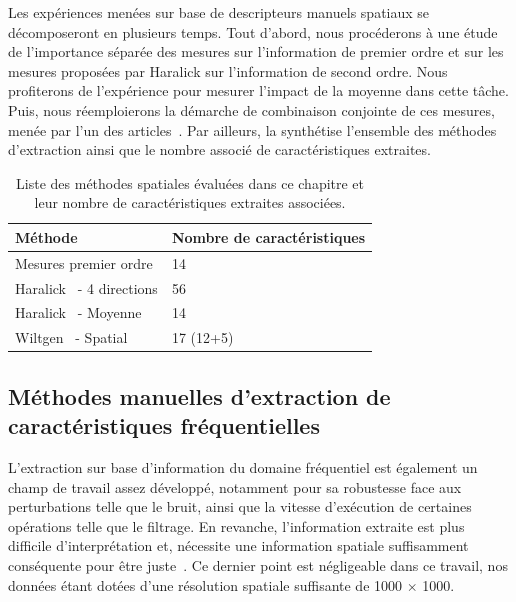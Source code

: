 Les expériences menées sur base de descripteurs manuels spatiaux se décomposeront en plusieurs temps. Tout d'abord, nous procéderons à une étude de l'importance séparée des mesures sur l'information de premier ordre et sur les mesures proposées par Haralick sur l'information de second ordre. Nous profiterons de l'expérience pour mesurer l'impact de la moyenne dans cette tâche. Puis, nous réemploierons la démarche de combinaison conjointe de ces mesures, menée par l'un des articles~\cite{Wiltgen2008}. Par ailleurs, la  synthétise l'ensemble des méthodes d'extraction ainsi que le nombre associé de caractéristiques extraites.\par
\begin{table}[h]
    \centering
    \begin{tabular}{ll}
        \toprule
        \textbf{Méthode}                            & \textbf{Nombre de caractéristiques}   \\ \hline
        Mesures premier ordre                       & 14                                    \\ \hline
        Haralick~\cite{Haralick1973} - 4 directions & 56                                    \\ \hline
        Haralick~\cite{Haralick1973} - Moyenne      & 14                                    \\ \hline
        Wiltgen~\cite{Wiltgen2008} - Spatial        & 17 (12+5)                             \\
        \bottomrule                 
    \end{tabular}
    \caption{Liste des méthodes spatiales évaluées dans ce chapitre et leur nombre de caractéristiques extraites associées.}
    \label{tab:number_features_spatial}
\end{table}

\subsection{Méthodes manuelles d'extraction de caractéristiques fréquentielles}
L'extraction sur base d'information du domaine fréquentiel est également un champ de travail assez développé, notamment pour sa robustesse face aux perturbations telle que le bruit, ainsi que la vitesse d'exécution de certaines opérations telle que le filtrage. En revanche, l'information extraite est plus difficile d'interprétation et, nécessite une information spatiale suffisamment conséquente pour être juste~\cite{Kamila2015}. Ce dernier point est négligeable dans ce travail, nos données étant dotées d'une résolution spatiale suffisante de \SI{1000}{\px} $\times$ \SI{1000}{\px}.\par

